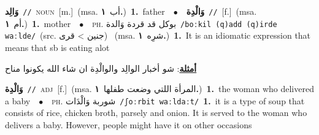 \documentclass[10pt,a4paper,twoside]{article} %
\begin{document}
\begin{multicols}{2}
{\setlength\topsep{0pt}\textbf{\foreignlanguage{arabic}{وَالِد}}\ {\color{gray}\texttt{//}\color{black}}\ \textsc{noun}\ [m.]\ \color{gray}(msa. \foreignlanguage{arabic}{أب}~\foreignlanguage{arabic}{\textbf{١.}})\color{black}\ \textbf{1.}~father\ \ $\bullet$\ \ \setlength\topsep{0pt}\textbf{\foreignlanguage{arabic}{وَالْدِة}}\ {\color{gray}\texttt{//}\color{black}}\ [f.]\ \color{gray}(msa. \foreignlanguage{arabic}{أم}~\foreignlanguage{arabic}{\textbf{١.}})\color{black}\ \textbf{1.}~mother\ \ $\bullet$\ \ \textsc{ph.} \color{gray} \foreignlanguage{arabic}{بوكل قد قردة وَالدة}\color{black}\ {\color{gray}\texttt{/{\sffamily boːkil (q)add (q)irde waːlde}/}\color{black}}\ \color{gray}(src. \foreignlanguage{arabic}{جنين > قرى})\color{black}\ \color{gray} (msa. \foreignlanguage{arabic}{شرِه}~\foreignlanguage{arabic}{\textbf{١.}})\color{black}\ \textbf{1.}~It is an idiomatic expression that means that sb is eating alot\  \begin{flushright}\color{gray}\foreignlanguage{arabic}{\textbf{\underline{\foreignlanguage{arabic}{أمثلة}}}: شو أخبار الوالِد والوالْدِة ان شاء الله يكونوا مناح}\end{flushright}\color{black}} \vspace{2mm}

{\setlength\topsep{0pt}\textbf{\foreignlanguage{arabic}{وَالْدِة}}\ {\color{gray}\texttt{//}\color{black}}\ \textsc{adj}\ [f.]\ \color{gray}(msa. \foreignlanguage{arabic}{المرأة اللتي وضعت طفلها}~\foreignlanguage{arabic}{\textbf{١.}})\color{black}\ \textbf{1.}~the woman who delivered a baby\ \ $\bullet$\ \ \textsc{ph.} \color{gray} \foreignlanguage{arabic}{شوربة وَالْدَات}\color{black}\ {\color{gray}\texttt{/{\sffamily ʃoːrbit waːldaːt}/}\color{black}}\ \textbf{1.}~it is a type of soup that consists of rice, chicken broth, parsely and onion. It is served to the woman who delivers a baby. However, people might have it on other occasions\ } \vspace{2mm}


\end{multicols}
\end{document}
